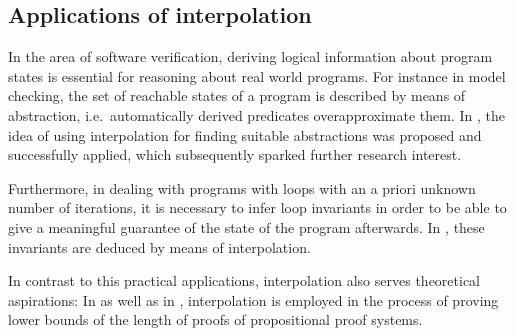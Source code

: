 \documentclass[,%
			paper=a4,%
			DIV11,
			liststotoc,
			bibtotoc,
			draft=false,%
			numbers=noendperiod
			]{scrartcl}
\theoremstyle{definition}
\begin{document}
\subsection{Applications of interpolation}

In the area of software verification, deriving logical information about program states is essential for reasoning about real world programs.
For instance in model checking, the set of reachable states of a program is described by means of abstraction, i.e.\ automatically derived predicates overapproximate them.
In \cite{McMillan03}, the idea of using interpolation for finding suitable abstractions was proposed and successfully applied, which subsequently sparked further research interest. 

Furthermore, in dealing with programs with loops with an a priori unknown number of iterations, it is necessary to infer loop invariants in order to be able to give a meaningful guarantee of the state of the program afterwards.
In \cite{weissenbacher2010}, these invariants are deduced by means of interpolation.

In contrast to this practical applications, interpolation also serves theoretical aspirations: In \cite{Pudlak97} as well as in \cite{krajivcek1997interpolation}, interpolation is employed in the process of proving lower bounds of the length of proofs of propositional proof systems.


\begin{comment}
After decades of continued research, the area of software verification still lacks effective methods for reasoning about real world programs, which is necessary to prove vital safety or liveness properties.
The emergence of symbolic model checking and bounded model checking constitute considerable advances.
Here, the set of reachable states of a program are described by means of abstraction, i.e.\ automatically derived predicates overapproximate them.
However for actually finding suitable abstractions, sophisticated methods are required.


In recent years, the approach of applying Craig interpolation to solve both of these problems enjoyed increasing popularity, especially after successful applications for instance in \cite{McMillan03} for use in abstraction or \cite{weissenbacher2010} for use in loop invariant generation.


Another noteworthy and in fact one of the first interpolation algorithms of practical interest was introduced in \cite{McMillan03}, where it was also embedded in a model checking procedure.
\end{comment}
\end{document}
